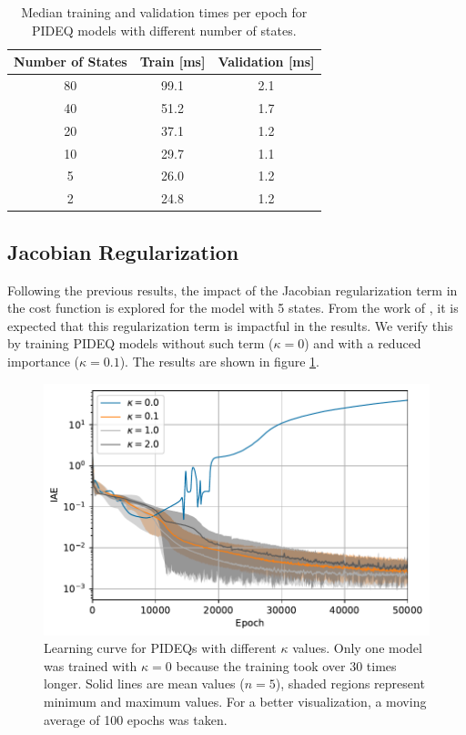 \begin{table}[h]
    \centering
    \caption{Median training and validation times per epoch for \gls{PIDEQ} models with different number of states.}
    \label{tab:n-states-times}
    \begin{tabular}{ccc}
	\toprule
	\textbf{Number of States} & \textbf{Train} [ms] & \textbf{Validation} [ms] \\ \midrule
	80       & 99.1       & 2.1             \\
	40       & 51.2       & 1.7             \\
	20       & 37.1       & 1.2             \\
	10       & 29.7       & 1.1             \\
	5        & 26.0       & 1.2             \\
	2        & 24.8       & 1.2             \\ \bottomrule
    \end{tabular}
\end{table}

\subsection{Jacobian Regularization}

Following the previous results, the impact of the Jacobian regularization term in the cost function is explored for the model with 5 states.
From the work of \textcite{bai_stabilizing_2021}, it is expected that this regularization term is impactful in the results.
We verify this by training \gls{PIDEQ} models without such term ($\kappa=0$) and with a reduced importance ($\kappa=0.1$).
The results are shown in figure \ref{fig:jac-lamb-iae}.

\begin{figure}[h]
    \centering
    \includegraphics{images/exp_4_iae.pdf}
    \caption{Learning curve for \gls{PIDEQ}s with different $\kappa$ values. Only one model was trained with $\kappa=0$ because the training took over 30 times longer. Solid lines are mean values ($n=5$), shaded regions represent minimum and maximum values. For a better visualization, a moving average of 100 epochs was taken.}
    \label{fig:jac-lamb-iae}
\end{figure}

